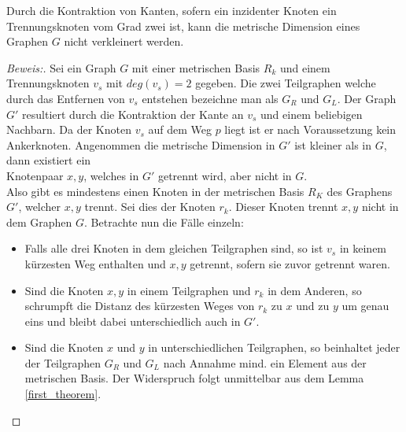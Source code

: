 \begin{lem}
\label{sepvertex2}
Durch die Kontraktion von Kanten, sofern ein inzidenter Knoten ein Trennungsknoten vom Grad zwei ist, kann die metrische Dimension eines Graphen $G$ nicht verkleinert werden.
\end{lem}
\begin{proof}[Beweis:]
Sei ein Graph $G$ mit einer metrischen Basis $R_k$ und einem Trennungsknoten $v_s$ mit $deg(v_s)=2$ gegeben. Die zwei Teilgraphen welche durch das Entfernen von $v_s$ entstehen bezeichne man als $G_R$ und $G_L$.
Der Graph $G'$ resultiert durch die Kontraktion der Kante an $v_s$ und einem beliebigen Nachbarn. Da der Knoten $v_s$ auf dem Weg $p$ liegt ist er nach Voraussetzung kein Ankerknoten.\newline
Angenommen die metrische Dimension in $G'$ ist kleiner als in $G$, dann existiert ein\\Knotenpaar $x,y$, welches in $G'$ getrennt wird, aber nicht in $G$.\\Also gibt es mindestens einen Knoten in der metrischen Basis $R_K$ des Graphens $G'$, welcher $x,y$ trennt. Sei dies der Knoten $r_k$. Dieser Knoten trennt $x,y$ nicht in dem Graphen $G$. 
Betrachte nun die Fälle einzeln:
\begin{itemize}
\item Falls alle drei Knoten in dem gleichen Teilgraphen sind, so ist $v_s$ in keinem kürzesten Weg enthalten und $x,y$ getrennt, sofern sie zuvor getrennt waren.
\item Sind die Knoten $x,y$ in einem Teilgraphen und $r_k$ in dem Anderen, so schrumpft die Distanz des kürzesten Weges von $r_k$ zu $x$ und zu $y$ um genau eins und bleibt dabei unterschiedlich auch in $G'$.
\item Sind die Knoten $x$ und $y$ in unterschiedlichen Teilgraphen, so beinhaltet jeder der Teilgraphen $G_R$ und $G_L$ nach Annahme mind. ein Element aus der metrischen Basis. Der Widerspruch folgt unmittelbar aus dem Lemma \ref{first_theorem}.
\vspace{-5mm}
\end{itemize}
\end{proof}
